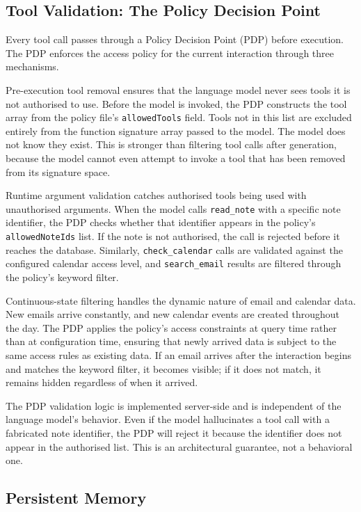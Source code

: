 \documentclass[11pt]{article}
\begin{document}
\subsection{Tool Validation: The Policy Decision Point}

Every tool call passes through a Policy Decision Point (PDP) before execution. The PDP enforces the access policy for the current interaction through three mechanisms.

Pre-execution tool removal ensures that the language model never sees tools it is not authorised to use. Before the model is invoked, the PDP constructs the tool array from the policy file's \texttt{allowedTools} field. Tools not in this list are excluded entirely from the function signature array passed to the model. The model does not know they exist. This is stronger than filtering tool calls after generation, because the model cannot even attempt to invoke a tool that has been removed from its signature space.

Runtime argument validation catches authorised tools being used with unauthorised arguments. When the model calls \texttt{read\_note} with a specific note identifier, the PDP checks whether that identifier appears in the policy's \texttt{allowedNoteIds} list. If the note is not authorised, the call is rejected before it reaches the database. Similarly, \texttt{check\_calendar} calls are validated against the configured calendar access level, and \texttt{search\_email} results are filtered through the policy's keyword filter.

Continuous-state filtering handles the dynamic nature of email and calendar data. New emails arrive constantly, and new calendar events are created throughout the day. The PDP applies the policy's access constraints at query time rather than at configuration time, ensuring that newly arrived data is subject to the same access rules as existing data. If an email arrives after the interaction begins and matches the keyword filter, it becomes visible; if it does not match, it remains hidden regardless of when it arrived.

The PDP validation logic is implemented server-side and is independent of the language model's behavior. Even if the model hallucinates a tool call with a fabricated note identifier, the PDP will reject it because the identifier does not appear in the authorised list. This is an architectural guarantee, not a behavioral one.


\subsection{Persistent Memory}
\end{document}
